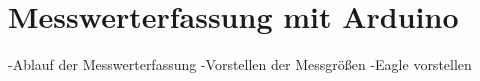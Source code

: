 \section{Messwerterfassung mit Arduino}
-Ablauf der Messwerterfassung
-Vorstellen der Messgrößen
-Eagle vorstellen
